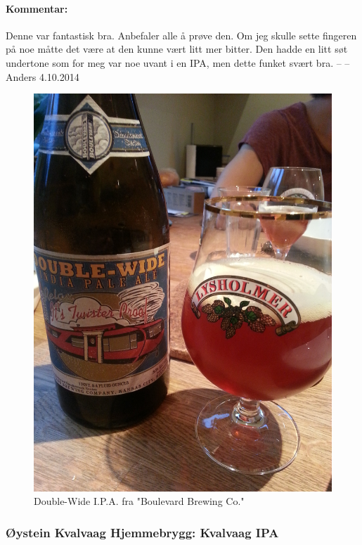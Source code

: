 \documentclass[12pt,a4paper,oneside,norsk]{article}
\begin{document}
\paragraph{Kommentar:} Denne var fantastisk bra. Anbefaler alle å prøve den. Om jeg skulle sette fingeren på noe måtte det være at den kunne vært litt mer bitter. Den hadde en litt søt undertone som for meg var noe uvant i en IPA, men dette funket svært bra.
\newline
-- -- Anders 4.10.2014

\begin{figure} [H]
\centering
\includegraphics[scale=0.1, angle=270]{Bilder/Ol/Double-Wide.jpg}
\caption{Double-Wide I.P.A. fra "Boulevard Brewing Co."}
\end{figure}

\newpage
\subsubsection{Øystein Kvalvaag Hjemmebrygg: Kvalvaag IPA}
\end{document}
